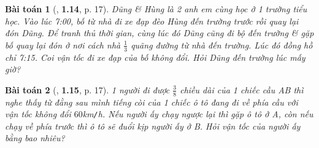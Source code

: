 \documentclass{article}
\numberwithin{equation}{section}
\newtheorem{baitoan}{Bài toán}[section]
\begin{document}
\begin{baitoan}[\cite{Thinh_Lua2021}, \textbf{1.14}, p. 17]
	Dũng \& Hùng là 2 anh em cùng học ở 1 trường tiểu học. Vào lúc 7:00, bố từ nhà đi xe đạp đèo Hùng đến trường trước rồi quay lại đón Dũng. Để tranh thủ thời gian, cùng lúc đó Dũng cũng đi bộ đến trường \& gặp bố quay lại đón ở nơi cách nhà $\frac{1}{3}$ quãng đường từ nhà đến trường. Lúc đó đồng hồ chỉ 7:15. Coi vận tốc đi xe đạp của bố không đổi. Hỏi Dũng đến trường lúc mấy giờ?
\end{baitoan}

\begin{baitoan}[\cite{Thinh_Lua2021}, \textbf{1.15}, p. 17]
	1 người đi được $\frac{3}{8}$ chiều dài của 1 chiếc cầu AB thì nghe thấy từ đằng sau mình tiếng còi của 1 chiếc ô tô đang đi về phía cầu với vận tốc không đổi $60$\emph{km\texttt{/}h}. Nếu người ấy chạy ngược lại thì gặp ô tô ở A, còn nếu chạy về phía trước thì ô tô sẽ đuổi kịp người ấy ở B. Hỏi vận tốc của người ấy bằng bao nhiêu?
\end{baitoan}


\printbibliography[heading=bibintoc]
	
\end{document}
